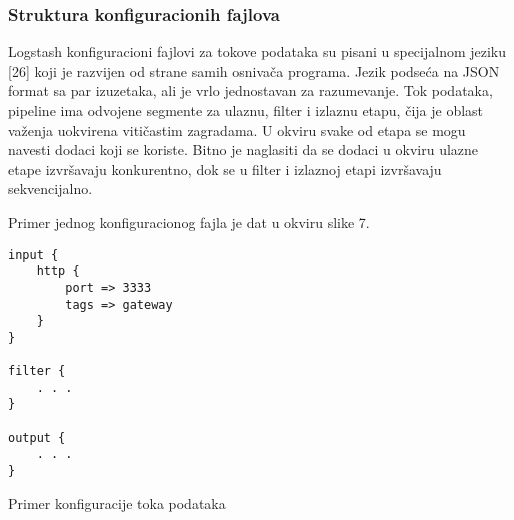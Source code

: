 \subsubsection{Struktura konfiguracionih fajlova}
Logstash konfiguracioni fajlovi za tokove podataka su pisani u specijalnom jeziku [26] koji je razvijen od strane samih osnivača programa. Jezik podseća na JSON format sa par izuzetaka, ali je vrlo jednostavan za razumevanje.
Tok podataka, pipeline ima odvojene segmente za ulaznu, filter i izlaznu etapu, čija je oblast važenja uokvirena vitičastim zagradama. U okviru svake od etapa se mogu navesti dodaci koji se koriste.  Bitno je naglasiti da se dodaci u okviru ulazne etape izvršavaju konkurentno, dok se u filter i izlaznoj etapi izvršavaju sekvencijalno.

\par
Primer jednog konfiguracionog fajla je dat u okviru slike 7.
\begin{listing}[H]
\begin{verbatim}
input {
    http {
        port => 3333
        tags => gateway
    }
}

filter {
    . . . 
}

output {
    . . .
}
\end{verbatim}
\caption{Primer konfiguracije toka podataka}
\label{code:primer-konfiguracije-toka-podataka}
\end{listing}

